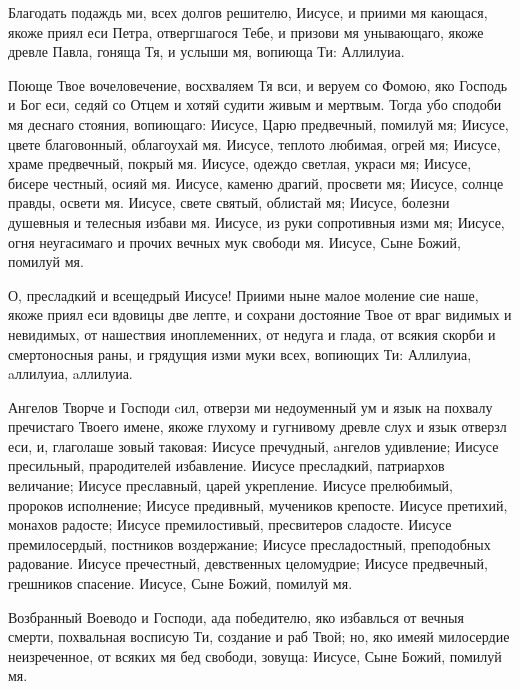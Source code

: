 \begin{mymulticols}

Благодать
подаждь ми, всех долгов решителю, Иисусе, и приими мя кающася, якоже приял еси Петра, отвергшагося Тебе, и призови мя унывающаго, якоже древле Павла, гоняща Тя, и услыши мя, вопиюща Ти: Аллилуиа.


Поюще
Твое вочеловечение, восхваляем Тя вси, и веруем со Фомою, яко Господь и Бог еси, седяй со Отцем и хотяй судити живым и мертвым. Тогда убо сподоби мя деснаго стояния, вопиющаго: Иисусе, Царю предвечный, помилуй мя; Иисусе, цвете благовонный, облагоухай мя. Иисусе, теплото любимая, огрей мя; Иисусе, храме предвечный, покрый мя. Иисусе, одеждо светлая, украси мя; Иисусе, бисере честный, осияй мя. Иисусе, каменю драгий, просвети мя; Иисусе, солнце правды, освети мя. Иисусе, свете святый, облистай мя; Иисусе, болезни душевныя и телесныя избави мя. Иисусе, из руки сопротивныя изми мя; Иисусе, огня неугасимаго и прочих вечных мук свободи мя. Иисусе, Сыне Божий, помилуй мя.


О,
пресладкий и всещедрый Иисусе! Приими ныне малое моление сие наше, якоже приял еси вдовицы две лепте, и сохрани достояние Твое от враг видимых и невидимых, от нашествия иноплеменних, от недуга и глада, от всякия скорби и смертоносныя раны, и грядущия изми муки всех, вопиющих Ти: Аллилуиа, aллилуиа, aллилуиа.



Ангелов
Творче и Господи cил, отверзи ми недоуменный ум и язык на похвалу пречистаго Твоего имене, якоже глухому и гугнивому древле слух и язык отверзл еси, и, глаголаше зовый таковая: Иисусе пречудный, aнгелов удивление; Иисусе пресильный, прародителей избавление. Иисусе пресладкий, патриархов величание; Иисусе преславный, царей укрепление. Иисусе прелюбимый, пророков исполнение; Иисусе предивный, мучеников крепосте. Иисусе претихий, монахов радосте; Иисусе премилостивый, пресвитеров сладосте. Иисусе премилосердый, постников воздержание; Иисусе пресладостный, преподобных радование. Иисусе пречестный, девственных целомудрие; Иисусе предвечный, грешников спасение. Иисусе, Сыне Божий, помилуй мя.


Возбранный
Воеводо и Господи, ада победителю, яко избавлься от вечныя смерти, похвальная восписую Ти, создание и раб Твой; но, яко имеяй милосердие неизреченное, от всяких мя бед свободи, зовуща: Иисусе, Сыне Божий, помилуй мя.


\end{mymulticols}
